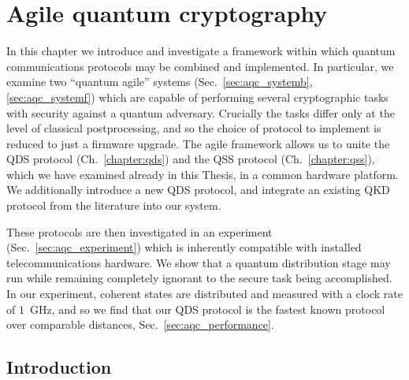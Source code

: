 %
%

%





\chapter{Agile quantum cryptography}\label{chapter:aqc}

In this chapter we introduce and investigate a framework within which quantum communications protocols may be combined and implemented. In particular, we examine two ``quantum agile'' systems (Sec.~\ref{sec:aqc_systemb}, \ref{sec:aqc_systemf}) which are capable of performing several cryptographic tasks with security against a quantum adversary. Crucially the tasks differ only at the level of classical postprocessing, and so the choice of protocol to implement is reduced to just a firmware upgrade. The agile framework allows us to unite the QDS protocol (Ch.~\ref{chapter:qds}) and the QSS protocol (Ch.~\ref{chapter:qss}), which we have examined already in this Thesis, in a common hardware platform. We additionally introduce a new QDS protocol, and integrate an existing QKD protocol from the literature into our system.

These protocols are then investigated in an experiment (Sec.~\ref{sec:aqc_experiment}) which is inherently compatible with installed telecommunications hardware. We show that a quantum distribution stage may run while remaining completely ignorant to the secure task being accomplished. In our experiment, coherent states are distributed and measured with a clock rate of $1$~GHz, and so we find that our QDS protocol is the fastest known protocol over comparable distances, Sec.~\ref{sec:aqc_performance}.

\section{Introduction}

